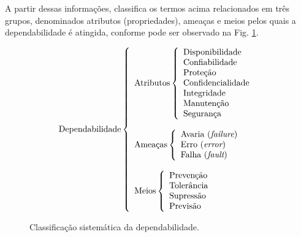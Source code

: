 A partir dessas informações,  classifica os termos
acima relacionados em três grupos, denominados atributos (propriedades), ameaças
e meios pelos quais a dependabilidade é atingida, conforme pode ser observado
na Fig. \ref{fig:div_avizienis}.

\begin{figure}[htb]
\centering
\footnotesize
\[
\text{Dependabilidade}
\left\{
\begin{array}{l}
\text{Atributos}
    \left\{
    \begin{array}{l}
        \text{Disponibilidade}\\
        \text{Confiabilidade}\\
        \text{Proteção}\\
        \text{Confidencialidade}\\
        \text{Integridade}\\
        \text{Manutenção}\\
        \text{Segurança}
    \end{array}
    \right.
\\
\\
\text{Ameaças}
    \left\{
    \begin{array}{l}
        \text{Avaria ({\it failure})}\\
        \text{Erro ({\it error})}\\
        \text{Falha ({\it fault})}
    \end{array}
    \right.
\\
\\
\text{Meios}
    \left\{
    \begin{array}{l}
        \text{Prevenção}\\
        \text{Tolerância}\\
        \text{Supressão}\\
        \text{Previsão}
    \end{array}
    \right.
\end{array}
\right.
\]
\caption{Classificação sistemática da dependabilidade.}
\label{fig:div_avizienis}
\end{figure}

